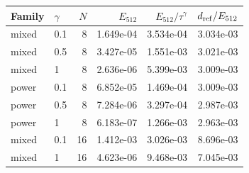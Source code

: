 \begin{tabular}{llrrrr}
\toprule
Family & $\gamma$ & $N$ & $E_{512}$ & $E_{512}/\tau^\gamma$ & $d_{\rm ref}/E_{512}$\\
\midrule
mixed & 0.1 & 8 & 1.649e-04 & 3.534e-04 & 3.034e-03 \\
mixed & 0.5 & 8 & 3.427e-05 & 1.551e-03 & 3.021e-03 \\
mixed & 1 & 8 & 2.636e-06 & 5.399e-03 & 3.009e-03 \\
power & 0.1 & 8 & 6.852e-05 & 1.469e-04 & 3.009e-03 \\
power & 0.5 & 8 & 7.284e-06 & 3.297e-04 & 2.987e-03 \\
power & 1 & 8 & 6.183e-07 & 1.266e-03 & 2.963e-03 \\
mixed & 0.1 & 16 & 1.412e-03 & 3.026e-03 & 8.696e-03 \\
mixed & 1 & 16 & 4.623e-06 & 9.468e-03 & 7.045e-03 \\
\bottomrule
\end{tabular}
